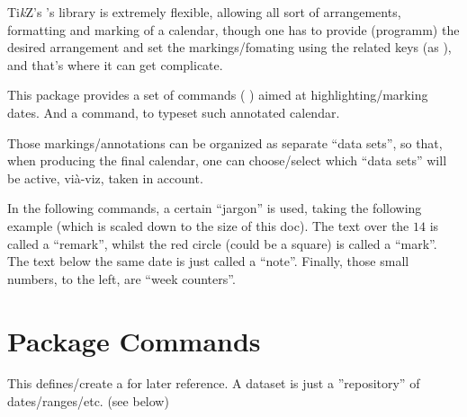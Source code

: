 \documentclass{article}
\begin{document}
Ti\emph{k}Z's 's library is extremely flexible, allowing all sort of arrangements, formatting and marking of a calendar, though one has to provide (programm) the desired arrangement and set the markings/fomating using the related keys (as ), and that's where it can get complicate.

This package provides a set of commands ( \tsobj{\setcountingweeks,\suppresscouting,\setdates,\setranges,\sethighlightdates} ) aimed at  highlighting/marking dates. And a command, \tsobj{\calendarnotes} to typeset such annotated calendar.

Those markings/annotations can be organized as separate ``data sets'', so that, when producing the final calendar, one can choose/select which ``data sets'' will be active, vi\-à-viz, taken in account.

In the following commands, a certain ``jargon'' is used, taking the following example (which is scaled down to the size of this doc). The text over the $14$ is called a ``remark'', whilst the red circle (could be a square) is called a ``mark''. The text below the same date is just called a ``note''. Finally, those small numbers, to the left, are ``week counters''.

\begin{codestore}[demoA]

\end{codestore}




\section{Package Commands}
\begin{codedescribe}{}
\begin{codesyntax}%
\end{codesyntax}
This defines/create a  for later reference. A dataset is just a ''repository'' of dates/ranges/etc. (see below)
\end{codedescribe}
\end{document}
